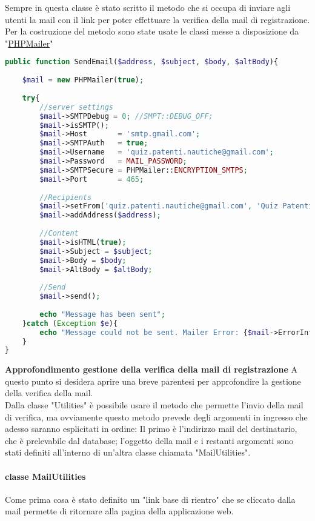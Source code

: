 Sempre in questa classe è stato scritto il metodo che si occupa di inviare agli utenti la mail con il link per poter effettuare la verifica della mail di registrazione.\\
Per la costruzione del metodo sono state usate le classi messe a disposizione da "\href{https://github.com/PHPMailer/PHPMailer}{PHPMailer}"

\begin{lstlisting}[language=php]
public function SendEmail($address, $subject, $body, $altBody){
	
	$mail = new PHPMailer(true);
	
	try{
		//server settings
		$mail->SMTPDebug = 0; //SMPT::DEBUG_OFF;
		$mail->isSMTP();
		$mail->Host       = 'smtp.gmail.com';
		$mail->SMTPAuth   = true;
		$mail->Username   = 'quiz.patenti.nautiche@gmail.com';
		$mail->Password   = MAIL_PASSWORD;
		$mail->SMTPSecure = PHPMailer::ENCRYPTION_SMTPS;
		$mail->Port       = 465;
		
		//Recipients
		$mail->setFrom('quiz.patenti.nautiche@gmail.com', 'Quiz Patenti Nautiche');
		$mail->addAddress($address);
		
		//Content
		$mail->isHTML(true);
		$mail->Subject = $subject;
		$mail->Body = $body;
		$mail->AltBody = $altBody;
		
		//Send
		$mail->send();
		
		echo "Message has been sent";
	}catch (Exception $e){
		echo "Message could not be sent. Mailer Error: {$mail->ErrorInfo}";
	}
}
\end{lstlisting}

\textbf{Approfondimento gestione della verifica della mail di registrazione}
A questo punto si desidera aprire una breve parentesi per approfondire la gestione della verifica della mail.\\
Dalla classe "Utilities" è possibile usare il metodo che permette l'invio della mail di verifica, ma ovviamente questo metodo prevede degli argomenti in ingresso che adesso saranno esplicitati in ordine: Il primo è l'indirizzo mail del destinatario, che è prelevabile dal database; l'oggetto della mail e i restanti argomenti sono stati definiti all'interno di un'altra classe chiamata "MailUtilities".\\

\paragraph{classe MailUtilities}

Come prima cosa è stato definito un "link base di rientro" che se cliccato dalla mail permette di ritornare alla pagina della applicazione web.\\

